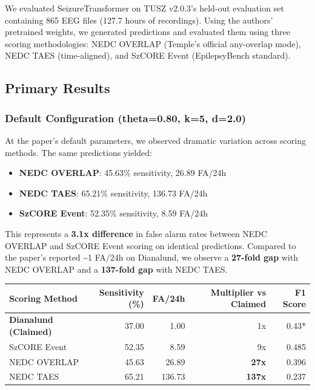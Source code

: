 \documentclass[
]{article}
\providecommand{\tightlist}{%
  \setlength{\itemsep}{0pt}\setlength{\parskip}{0pt}}
\begin{document}
We evaluated SeizureTransformer on TUSZ v2.0.3's held-out evaluation set
containing 865 EEG files (127.7 hours of recordings). Using the authors'
pretrained weights, we generated predictions and evaluated them using
three scoring methodologies: NEDC OVERLAP (Temple's official any-overlap
mode), NEDC TAES (time-aligned), and SzCORE Event (EpilepsyBench
standard).

\hypertarget{primary-results}{%
\subsection{Primary Results}\label{primary-results}}

\hypertarget{default-configuration-theta0.80-k5-d2.0}{%
\subsubsection{Default Configuration (theta=0.80, k=5,
d=2.0)}\label{default-configuration-theta0.80-k5-d2.0}}

At the paper's default parameters, we observed dramatic variation across
scoring methods. The same predictions yielded:

\begin{itemize}
\tightlist
\item
  \textbf{NEDC OVERLAP}: 45.63\% sensitivity, 26.89 FA/24h
\item
  \textbf{NEDC TAES}: 65.21\% sensitivity, 136.73 FA/24h
\item
  \textbf{SzCORE Event}: 52.35\% sensitivity, 8.59 FA/24h
\end{itemize}

This represents a \textbf{3.1x difference} in false alarm rates between
NEDC OVERLAP and SzCORE Event scoring on identical predictions. Compared
to the paper's reported \textasciitilde1 FA/24h on Dianalund, we observe
a \textbf{27-fold gap} with NEDC OVERLAP and a \textbf{137-fold gap}
with NEDC TAES.

\begin{longtable}[]{@{}lrrrr@{}}
\toprule
Scoring Method & Sensitivity (\%) & FA/24h & Multiplier vs Claimed & F1
Score\tabularnewline
\midrule
\endhead
\textbf{Dianalund (Claimed)} & 37.00 & 1.00 & 1x & 0.43*\tabularnewline
SzCORE Event & 52.35 & 8.59 & 9x & 0.485\tabularnewline
NEDC OVERLAP & 45.63 & 26.89 & \textbf{27x} & 0.396\tabularnewline
NEDC TAES & 65.21 & 136.73 & \textbf{137x} & 0.237\tabularnewline
\bottomrule
\end{longtable}
\end{document}
